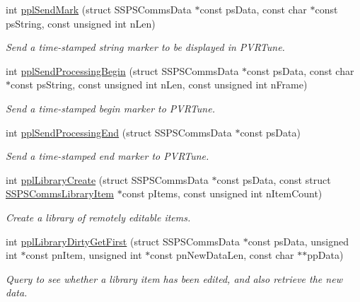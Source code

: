 \begin{DoxyCompactItemize}
int \hyperlink{group___scope_comms_ga855d70bb07956fd9ddc1feced46c5015}{ppl\+Send\+Mark} (struct S\+S\+P\+S\+Comms\+Data $\ast$const ps\+Data, const char $\ast$const ps\+String, const unsigned int n\+Len)
\begin{DoxyCompactList}\small\item\em Send a time-\/stamped string marker to be displayed in P\+V\+R\+Tune. \end{DoxyCompactList}\item 
int \hyperlink{group___scope_comms_gab25413fc073bcd62aed8b4d2f1c8b246}{ppl\+Send\+Processing\+Begin} (struct S\+S\+P\+S\+Comms\+Data $\ast$const ps\+Data, const char $\ast$const ps\+String, const unsigned int n\+Len, const unsigned int n\+Frame)
\begin{DoxyCompactList}\small\item\em Send a time-\/stamped begin marker to P\+V\+R\+Tune. \end{DoxyCompactList}\item 
int \hyperlink{group___scope_comms_gafd5273a3ba2bc28b1e1138a12c721f9b}{ppl\+Send\+Processing\+End} (struct S\+S\+P\+S\+Comms\+Data $\ast$const ps\+Data)
\begin{DoxyCompactList}\small\item\em Send a time-\/stamped end marker to P\+V\+R\+Tune. \end{DoxyCompactList}\item 
int \hyperlink{group___scope_comms_ga7d0601be52b7dc4079aa48f91df78070}{ppl\+Library\+Create} (struct S\+S\+P\+S\+Comms\+Data $\ast$const ps\+Data, const struct \hyperlink{struct_s_s_p_s_comms_library_item}{S\+S\+P\+S\+Comms\+Library\+Item} $\ast$const p\+Items, const unsigned int n\+Item\+Count)
\begin{DoxyCompactList}\small\item\em Create a library of remotely editable items. \end{DoxyCompactList}\item 
int \hyperlink{group___scope_comms_ga65cbea95a10b56a3f1c33cee96897afa}{ppl\+Library\+Dirty\+Get\+First} (struct S\+S\+P\+S\+Comms\+Data $\ast$const ps\+Data, unsigned int $\ast$const pn\+Item, unsigned int $\ast$const pn\+New\+Data\+Len, const char $\ast$$\ast$pp\+Data)
\begin{DoxyCompactList}\small\item\em Query to see whether a library item has been edited, and also retrieve the new data. \end{DoxyCompactList}\item 
$$
\end{DoxyCompactItemize}
